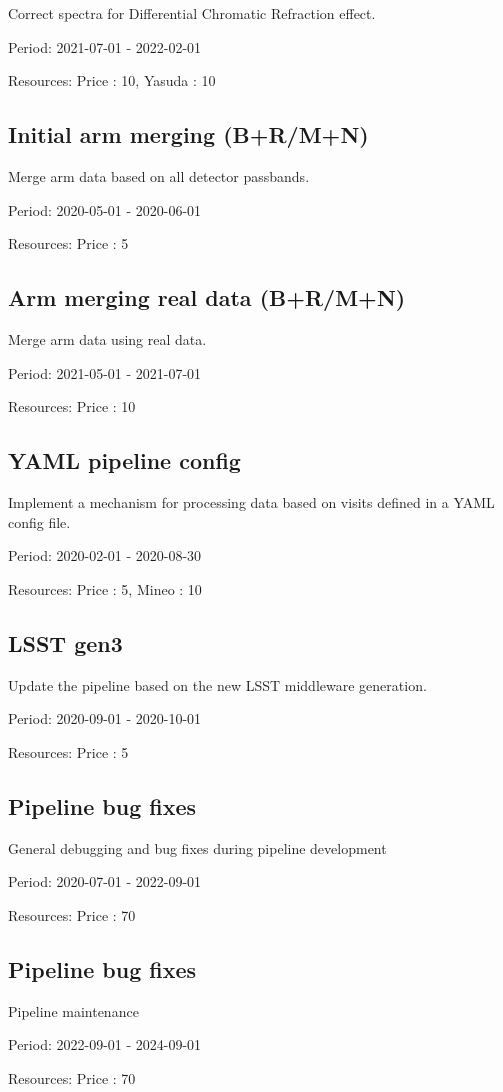 Correct spectra for Differential Chromatic Refraction effect.

Period: 2021-07-01 - 2022-02-01

Resources: Price : 10, Yasuda : 10

\subsection{Initial arm merging (B+R/M+N)}

Merge arm data based on all detector passbands.

Period: 2020-05-01 - 2020-06-01

Resources: Price : 5

\subsection{Arm merging real data (B+R/M+N)}

Merge arm data using real data.

Period: 2021-05-01 - 2021-07-01

Resources: Price : 10

\subsection{YAML pipeline config}

Implement a mechanism for processing data based on visits defined in a YAML config file.

Period: 2020-02-01 - 2020-08-30

Resources: Price : 5, Mineo : 10

\subsection{LSST gen3}

Update the pipeline based on the new LSST middleware generation.

Period: 2020-09-01 - 2020-10-01

Resources: Price : 5

\subsection{Pipeline bug fixes}

General debugging and bug fixes during pipeline development

Period: 2020-07-01 - 2022-09-01

Resources: Price : 70

\subsection{Pipeline bug fixes}

Pipeline maintenance

Period: 2022-09-01 - 2024-09-01

Resources: Price : 70

